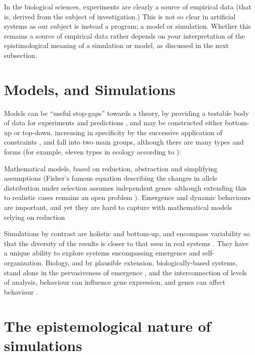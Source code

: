 In the biological sciences, experiments are clearly a source of empirical data (that is, derived from the subject of investigation.) This is not so clear in artificial systems as our subject is instead a program; a model or simulation. Whether this remains a source of empirical data rather depends on your interpretation of the epistimological meaning of a simulation or model, as discussed in the next subsection.

\section{Models, and Simulations}\label{models}


Models can be ``useful stop-gaps'' towards a theory, by providing a testable body of data for experiments and predictions \parencite{Krakauer2011}, and may be constructed either bottom-up or top-down, increasing in specificity by the successive application of constraints \parencite{Krakauer2011}, and fall into two main groups, although there are many types and forms (for example, eleven types in ecology according to \parencite{Jorgensen2008}):

Mathematical models, based on reduction, abstraction and simplifying assumptions (\eg Fisher's famous equation describing the changes in allele distribution under selection assumes independent genes--although extending this to realistic cases remains an open problem \parencite{Schuster2011}). Emergence and dynamic behaviours are important, and yet they are hard to capture with mathematical models relying on reduction \parencite{Ferrer:2008hv}

Simulations by contrast are holistic and bottom-up, and encompass variability so that the diversity of the results is closer to that seen in real systems \parencite{Ferrer:2008hv}. They have a unique ability to explore systems encompassing emergence and self-organization. Biology, and by plausible extension, biologically-based systems, stand alone in the pervasiveness of emergence \parencite{Bersini:2006ve}, and the interconnection of levels of analysis, \eg behaviour can influence gene expression, and genes can affect behaviour \parencite{Krakauer2011}.

\section{The epistemological nature of simulations}\label{the-epistemological-nature-of-simulations}


